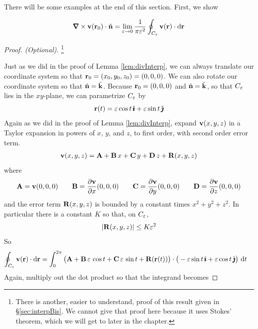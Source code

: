 There will be some examples at the end of this section.
First, we show

\begin{lemma}\label{lem:curlInterp}
\begin{equation*}
\vnabla\times \vv(\vr_0)\cdot \hn
=\lim_{\veps\rightarrow 0}\frac{1}{\pi\veps^2}
         \oint_{C_\veps} \vv(\vr)\cdot \dee{\vr}
\end{equation*}
\end{lemma}

\begin{proof}[Proof. (Optional)]\footnote{There is another, easier to understand, proof of this result given in \S\ref{sec:interpBis}. We cannot give that proof here because it uses Stokes' theorem, which we will get to
later in the chapter.}

Just as we did in the proof of Lemma \ref{lem:divInterp}, we can always
translate our coordinate system so that $\mathbf{r}_0=(x_0,y_0,z_0) = (0,0,0)$. 
We can also rotate our coordinate system so that $\hat{\mathbf{n}}=\hat{\mathbf{k}}$. 
Because $\mathbf{r}_0=(0,0,0)$ and $\hat{\mathbf{n}}=\hat{\mathbf{k}}$, so that $C_\varepsilon$ lies in the 
$xy$-plane, we can parametrize $C_\varepsilon$ by
\begin{equation*}
\mathbf{r}(t) =\varepsilon\cos t\,\hat{\pmb{\imath}} +\varepsilon\sin t\,\hat{\pmb{\jmath}}
\end{equation*}
Again as we did in the proof of Lemma \ref{lem:divInterp}, 
expand $\mathbf{v}(x,y,z)$ in a Taylor expansion in powers of $x$, $y$, and $z$,
to first order, with second order error term.
\begin{align*}
\mathbf{v}(x,y,z) = \mathbf{A} + \mathbf{B}\,x +\mathbf{C}\,y +\mathbf{D}\, z +\mathbf{R}(x,y,z)
\end{align*}
where
\begin{align*}
\mathbf{A}=\mathbf{v}(0,0,0) \qquad
\mathbf{B}=\frac{\partial \mathbf{v}}{\partial x}(0,0,0) \qquad
\mathbf{C}=\frac{\partial \mathbf{v}}{\partial y}(0,0,0) \qquad
\mathbf{D}=\frac{\partial \mathbf{v}}{\partial z}(0,0,0) 
\end{align*}
and the error term $\mathbf{R}(x,y,z)$ is bounded by a constant times
$x^2+y^2+z^2$. In particular there is a constant $K$ so that, on $C_\varepsilon$,
\begin{equation*}
|\mathbf{R}(x,y,z)|\le K\varepsilon^2
\end{equation*}
So
\begin{align*}
\oint_{C_\varepsilon} \mathbf{v}(\mathbf{r})\cdot \mathrm{d}\mathbf{r}
&=\int_0^{2\pi} \big(\mathbf{A} + \mathbf{B}\,\varepsilon\,\cos t +\mathbf{C}\,\varepsilon\,\sin t 
       +\mathbf{R}(\mathbf{r}(t))\big)
        \cdot \big(-\varepsilon\sin t\,\hat{\pmb{\imath}} +\varepsilon\cos t\,\hat{\pmb{\jmath}}\big)\ \mathrm{d}t
\end{align*}
Again, multiply out the dot product so that the integrand becomes

\end{proof}

